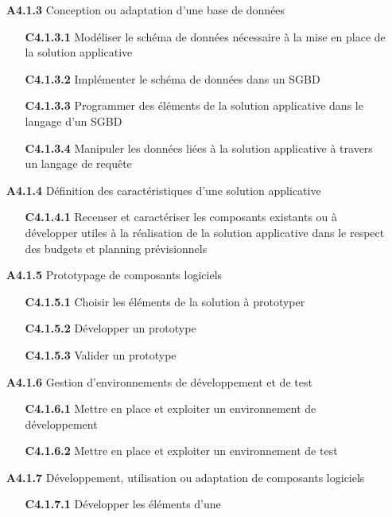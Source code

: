 \documentclass[12pt,a4paper,oneside,titlepage,final]{article}
\begin{document}
\begin{enumerate}
  \item [\textbf{A4.1.3}] Conception ou adaptation d'une base de
  données
  \begin{itemize}
    \item [\textbf{C4.1.3.1}] Modéliser le schéma de données
    nécessaire à la mise en place de la solution applicative
    \item [\textbf{C4.1.3.2}] Implémenter le schéma de données dans un
    SGBD
    \item [\textbf{C4.1.3.3}] Programmer des éléments de la solution
    applicative dans le langage d'un SGBD
    \item [\textbf{C4.1.3.4}] Manipuler les données liées à la
    solution applicative à travers un langage de requête
  \end{itemize}
  \item [\textbf{A4.1.4}] Définition des caractéristiques d'une
  solution applicative
  \begin{itemize}
    \item [\textbf{C4.1.4.1}] Recenser et caractériser les
    composants existants ou à développer utiles à la réalisation de la
    solution applicative dans le respect des budgets et planning
    prévisionnels
  \end{itemize}
  \item [\textbf{A4.1.5}] Prototypage de composants logiciels
  \begin{itemize}
    \item [\textbf{C4.1.5.1}] Choisir les éléments de la
    solution à prototyper
    \item [\textbf{C4.1.5.2}] Développer un prototype
    \item [\textbf{C4.1.5.3}] Valider un prototype
  \end{itemize}
  \item [\textbf{A4.1.6}] Gestion d'environnements de développement et
  de test
  \begin{itemize}
    \item [\textbf{C4.1.6.1}] Mettre en place et exploiter un
    environnement de développement
    \item [\textbf{C4.1.6.2}] Mettre en place et exploiter un
    environnement de test
  \end{itemize}
  \item [\textbf{A4.1.7}] Développement, utilisation ou adaptation de
  composants logiciels
  \begin{itemize}
    \item [\textbf{C4.1.7.1}] Développer les éléments d'une

\end{itemize}
\end{enumerate}
\end{document}
